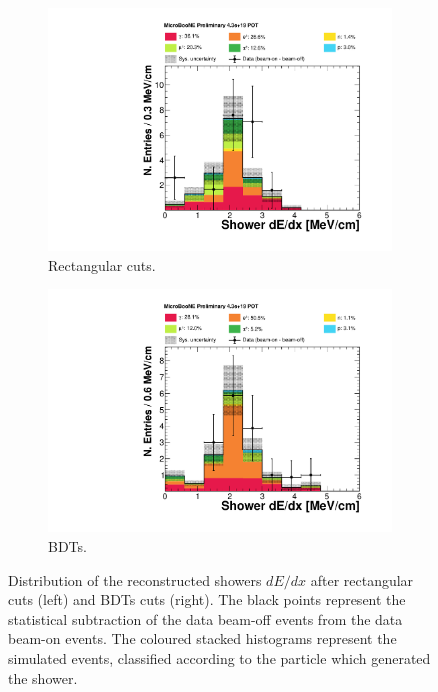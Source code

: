 \begin{figure}[htbp]
\centering
  \begin{subfigure}{0.48\textwidth}
    \includegraphics[width=\linewidth]{figures/dedx_cuts.pdf}
    \caption{Rectangular cuts.} 
  \end{subfigure}
    \begin{subfigure}{0.48\textwidth}
    \includegraphics[width=\linewidth]{figures/dedx_bdt.pdf}
    \caption{BDTs.} 
  \end{subfigure}
  \caption{Distribution of the reconstructed showers $dE/dx$ after rectangular cuts (left) and BDTs cuts (right). The black points represent the statistical subtraction of the data beam-off events from the data beam-on events. The coloured stacked histograms represent the simulated events, classified according to the particle which generated the shower.}
  \label{fig:dedx_after}
\end{figure}

